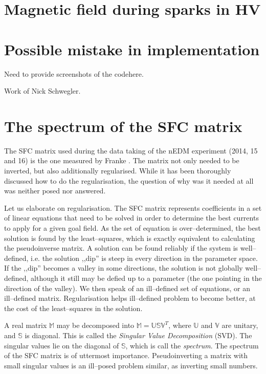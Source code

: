 \section{Magnetic field during sparks in HV}


\section{Possible mistake in implementation}
Need to provide screenshots of the codehere.

Work of Nick Schwegler.


\section{The spectrum of the SFC matrix}
The SFC matrix used during the data taking of the nEDM experiment (2014, 15 and 16) is the one measured by Franke \cite{Franke2013}. The matrix not only needed to be inverted, but also additionally regularised. While it has been thoroughly discussed how to do the regularisation, the question of why was it needed at all was neither posed nor answered.

Let us elaborate on regularisation. The SFC matrix represents coefficients in a set of linear equations that need to be solved in order to determine the best currents to apply for a given goal field. As the set of equation is over--determined, the best solution is found by the least--squares, which is exactly equivalent to calculating the pseudoinverse matrix. A solution can be found reliably if the system is well--defined, i.e. the solution ,,dip'' is steep in every direction in the parameter space. If the ,,dip'' becomes a valley in some directions, the solution is not globally well--defined, although it still may be defied up to a parameter (the one pointing in the direction of the valley). We then speak of an ill--defined set of equations, or an ill--defined matrix. Regularisation helps ill--defined problem to become better, at the cost of the least--squares in the solution.


A real matrix $\mathbb{M}$ may be decomposed into $\mathbb{M} = \mathbb{U} \mathbb{S} \mathbb{V}^T$, where $\mathbb{U}$ and $\mathbb{V}$ are unitary, and $\mathbb{S}$ is diagonal. This is called the \emph{Singular Value Decomposition} (SVD). The singular values lie on the diagonal of $\mathbb{S}$, which is call the \emph{spectrum}. The spectrum of the SFC matrix is of uttermost importance. Pseudoinverting a matrix with small singular values is an ill--posed problem similar, as inverting small numbers.

